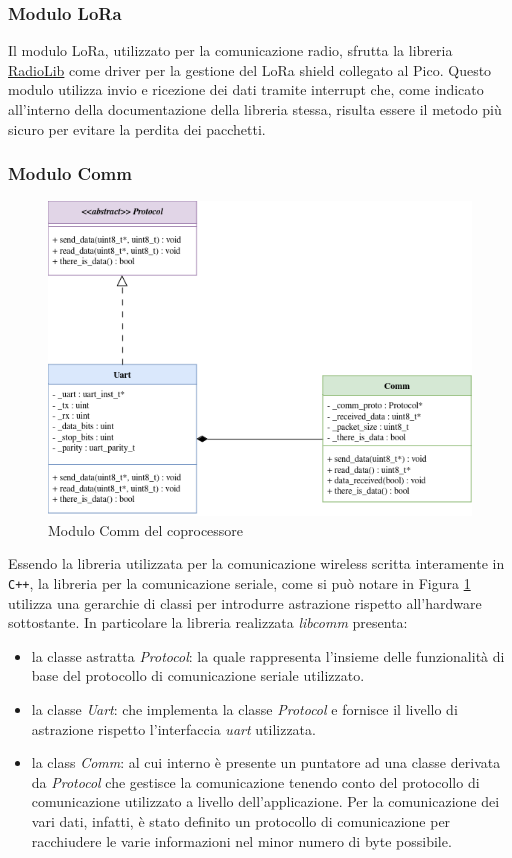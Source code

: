 \documentclass{article}
\begin{document}
	\subsubsection{Modulo LoRa}
	Il modulo LoRa, utilizzato per la comunicazione radio, sfrutta la libreria \href{https://github.com/jgromes/RadioLib}{RadioLib} come driver per la gestione del LoRa shield collegato al Pico.
	Questo modulo utilizza invio e ricezione dei dati tramite interrupt che, come indicato all'interno della documentazione della libreria stessa, risulta essere il metodo pi\`u sicuro per evitare la perdita dei pacchetti.
	
	\subsubsection{Modulo Comm}
	\begin{figure}[ht]
		\centering
		\includegraphics[scale=0.4]{./images/Comm_pico_uml.png}
		\caption{Modulo Comm del coprocessore}
		\label{img:comm_pico}
	\end{figure}
	\noindent Essendo la libreria utilizzata per la comunicazione wireless scritta interamente in \texttt{C++}, la libreria per la comunicazione seriale, come si pu\`o notare in Figura \ref{img:comm_pico} utilizza una gerarchie di classi per introdurre astrazione rispetto all'hardware sottostante.
	In particolare la libreria realizzata \textit{libcomm} presenta:
	\begin{itemize}
		\item la classe astratta \textit{Protocol}: la quale rappresenta l'insieme delle funzionalit\`a di base del protocollo di comunicazione seriale utilizzato.
		\item la classe \textit{Uart}: che implementa la classe \textit{Protocol} e fornisce il livello di astrazione rispetto l'interfaccia \textit{uart} utilizzata.
		\item la class \textit{Comm}: al cui interno \`e presente un puntatore ad una classe derivata da \textit{Protocol} che gestisce la comunicazione tenendo conto del protocollo di comunicazione utilizzato a livello dell'applicazione. Per la comunicazione dei vari dati, infatti, \`e stato definito un protocollo di comunicazione per racchiudere le varie informazioni nel minor numero di byte possibile.
	\end{itemize}
\end{document}
